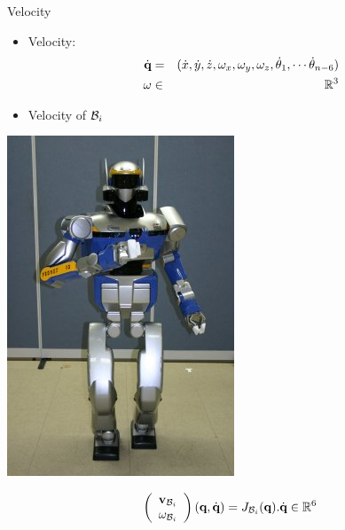 %
%

\begin{frame} {Velocity}
  \parbox{.71\linewidth} {
  \begin{itemize}
    \item Velocity: 
    \begin{eqnarray*}
      \dot{\textbf{q}} &=& (\dot{x}, \dot{y}, \dot{z}, \omega_{x}, \omega_{y}, \omega_{z},\dot{\theta}_1,\cdots \dot{\theta}_{n-6})\\
      \omega &\in& \mathbb{R}^3
    \end{eqnarray*}
  \pause
  \item Velocity of ${\cal B}_i$
  \end{itemize}
  }
  \parbox {.28\linewidth} {
    \centerline {
      \includegraphics[width=\linewidth]{figures/hrp2.jpg}
    }
  }
  \pause
   $$
    \left(\begin{array}{l} \textbf{v}_{{\cal B}_i} \\ \omega_{{\cal B}_i}\end{array}\right) (\textbf{q}, \dot{\textbf{q}}) = J_{{\cal B}_i} (\textbf{q}).\dot{\textbf{q}} \in \mathbb{R}^6
    $$
\end{frame}

